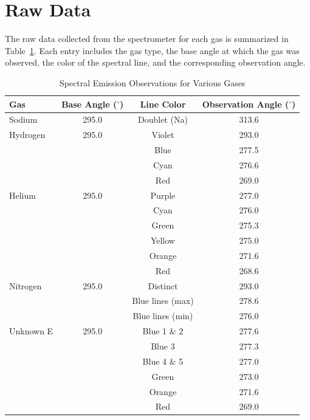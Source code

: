 \documentclass[11pt]{article}
\begin{document}
    \section{Raw Data}\label{sec:data}

        The raw data collected from the spectrometer for each gas is
        summarized in Table~\ref{tab:spectral_observations}.
        Each entry includes the gas type, the base angle at which the gas was
        observed, the color of the spectral line, and the corresponding
        observation angle.

        \begin{table}[H]
            \centering
            \caption{Spectral Emission Observations for Various Gases}
            \label{tab:spectral_observations}
            \begin{tabular}{lccc}
            \hline
            \textbf{Gas} & \textbf{Base Angle ($^\circ$)} & \textbf{Line Color} & \textbf{Observation Angle ($^\circ$)} \\ \hline
            Sodium & 295.0 & Doublet (Na) & 313.6 \\ \hline
            Hydrogen & 295.0 & Violet & 293.0 \\
             & & Blue & 277.5 \\
             & & Cyan & 276.6 \\
             & & Red & 269.0 \\ \hline
            Helium & 295.0 & Purple & 277.0 \\
             & & Cyan & 276.0 \\
             & & Green & 275.3 \\
             & & Yellow & 275.0 \\
             & & Orange & 271.6 \\
             & & Red & 268.6 \\ \hline
            Nitrogen & 295.0 & Distinct & 293.0 \\
             & & Blue lines (max) & 278.6 \\
             & & Blue lines (min) & 276.0 \\ \hline
            Unknown E & 295.0 & Blue 1 \& 2 & 277.6 \\
             & & Blue 3 & 277.3 \\
             & & Blue 4 \& 5 & 277.0 \\
             & & Green & 273.0 \\
             & & Orange & 271.6 \\
             & & Red & 269.0 \\ \hline
            \end{tabular}
        \end{table}
\end{document}

